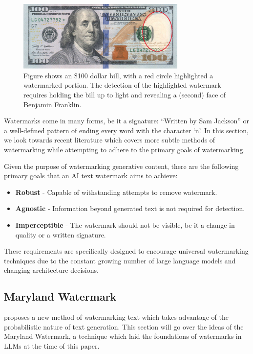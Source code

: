 \documentclass{l4proj}
\theoremstyle{definition}
\begin{document}
    \begin{figure}[h]
        \centering
        \includegraphics[height=3.5cm, width=1\linewidth, keepaspectratio]{images/background/dbill-highlighted.png}
        \caption{Figure shows an \$100 dollar bill, with a red circle highlighted a watermarked portion. The detection of the highlighted watermark requires holding the bill up to light and revealing a (second) face of Benjamin Franklin.}
         \label{fig:dbill-watermark} 
    \end{figure}

    Watermarks come in many forms, be it a signature: ``Written by Sam Jackson'' or a well-defined pattern of ending every word with the character `n'. In this section, we look towards recent literature which covers more subtle methods of watermarking while attempting to adhere to the primary goals of watermarking.
         
    Given the purpose of watermarking generative content, there are the following primary goals that an AI text watermark aims to achieve:
    \begin{itemize}
        \setlength\itemsep{0.5em}
        \item \textbf{Robust} - Capable of withstanding attempts to remove watermark.
        \item \textbf{Agnostic} - Information beyond generated text is not required for detection.
        \item \textbf{Imperceptible} - The watermark should not be visible, be it a change in quality or a written signature.
    \end{itemize}

    These requirements are specifically designed to encourage universal watermarking techniques due to the constant growing number of large language models and changing architecture decisions.
    
    \subsection{Maryland Watermark}
        \label{sec:maryland-watermark}
        \citet{kirchenbauer2023watermark} proposes a new method of watermarking text which takes advantage of the probabilistic nature of text generation. This section will go over the ideas of the Maryland Watermark, a technique which laid the foundations of watermarks in LLMs at the time of this paper.
\end{document}
